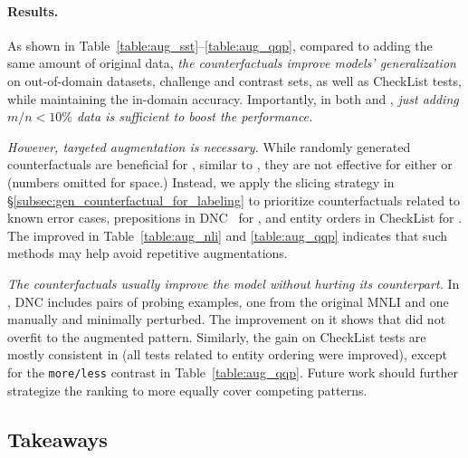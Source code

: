 \paragraph{Results.}
As shown in Table~\ref{table:aug_sst}--\ref{table:aug_qqp}, compared to adding the same amount of original data, \emph{the counterfactuals improve models' generalization} on out-of-domain datasets, challenge and contrast sets, as well as CheckList tests, while maintaining the in-domain accuracy.
Importantly, in both \nli and \qqp, \emph{just adding $m/n < 10\%$ data is sufficient to boost the performance.}

\TableAugQQP


\emph{However, targeted augmentation is necessary.}
While randomly generated counterfactuals are beneficial for \sst, similar to \citet{huang2020counterfactually}, they are not effective for either \nli or \qqp (numbers omitted for space.)
Instead, we apply the slicing strategy in \S\ref{subsec:gen_counterfactual_for_labeling} to prioritize counterfactuals related to known error cases, \eg prepositions in DNC~\cite{kim2019probing} for \nli, and entity orders in CheckList for \qqp.
The improved \maug in Table~\ref{table:aug_nli} and \ref{table:aug_qqp} indicates that such methods may help avoid repetitive augmentations.

\emph{The counterfactuals usually improve the model without hurting its counterpart.}
In \nli, DNC includes pairs of probing examples, one from the original MNLI and one manually and minimally perturbed.
The improvement on it shows that \maug did not overfit to the augmented pattern.
Similarly, the gain on CheckList tests are mostly consistent in \qqp (\eg all tests related to entity ordering were improved), except for the \texttt{more/less} contrast in Table~\ref{table:aug_qqp}.
Future work should further strategize the ranking to more equally cover competing patterns. 


\subsection{Takeaways}
\label{subsec:label_takeaway}


